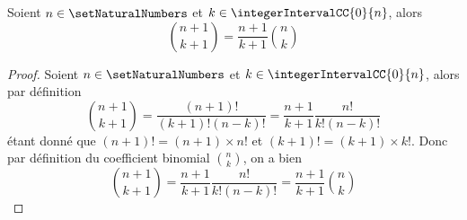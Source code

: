 \begin{property}
\label{binome:diagonale}
Soient $n \in \setNaturalNumbers$ et $k \in \integerIntervalCC{0}{n}$, alors 
\[
\binom{n+1}{k+1} = \dfrac{n+1}{k+1}\binom{n}{k}
\]
\end{property}

\begin{proof}
Soient $n \in \setNaturalNumbers$ et $k \in \integerIntervalCC{0}{n}$, alors par définition
\[
\binom{n+1}{k+1} = \dfrac{(n+1)!}{(k+1)!(n-k)!} = \dfrac{n+1}{k+1}\dfrac{n!}{k!(n-k)!}
\]
étant donné que $(n+1)! = (n+1)\times n!$ et $(k+1)! = (k+1)\times k!$. Donc par définition du coefficient binomial $\displaystyle\binom{n}{k}$, on a bien 
\[
\binom{n+1}{k+1} = \dfrac{n+1}{k+1}\dfrac{n!}{k!(n-k)!} = \dfrac{n+1}{k+1}\binom{n}{k}
\]
\end{proof}
